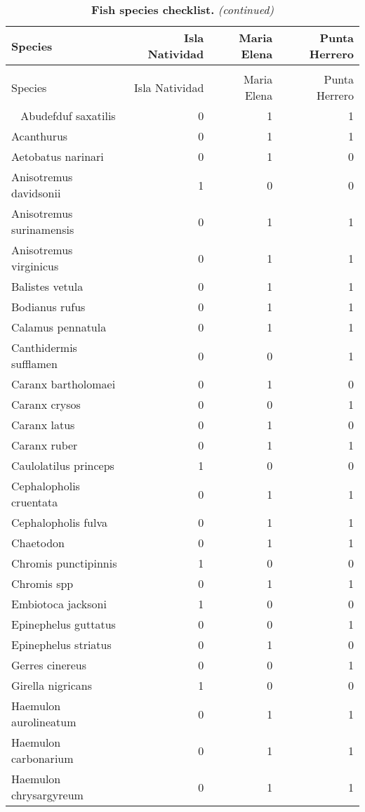 
\begin{longtable}{lrrr}
\caption{\label{tab:}{\bf Fish species checklist.}}\\
\toprule
Species & Isla Natividad & Maria Elena & Punta Herrero\\
\midrule
\endfirsthead
\caption[]{{\bf Fish species checklist.} \textit{(continued)}}\\
\toprule
Species & Isla Natividad & Maria Elena & Punta Herrero\\
\midrule
\endhead
\
\endfoot
\bottomrule
\endlastfoot
Abudefduf saxatilis & 0 & 1 & 1\\
Acanthurus & 0 & 1 & 1\\
Aetobatus narinari & 0 & 1 & 0\\
Anisotremus davidsonii & 1 & 0 & 0\\
Anisotremus surinamensis & 0 & 1 & 1\\
\addlinespace
Anisotremus virginicus & 0 & 1 & 1\\
Balistes vetula & 0 & 1 & 1\\
Bodianus rufus & 0 & 1 & 1\\
Calamus pennatula & 0 & 1 & 1\\
Canthidermis sufflamen & 0 & 0 & 1\\
\addlinespace
Caranx bartholomaei & 0 & 1 & 0\\
Caranx crysos & 0 & 0 & 1\\
Caranx latus & 0 & 1 & 0\\
Caranx ruber & 0 & 1 & 1\\
Caulolatilus princeps & 1 & 0 & 0\\
\addlinespace
Cephalopholis cruentata & 0 & 1 & 1\\
Cephalopholis fulva & 0 & 1 & 1\\
Chaetodon & 0 & 1 & 1\\
Chromis punctipinnis & 1 & 0 & 0\\
Chromis spp & 0 & 1 & 1\\
\addlinespace
Embiotoca jacksoni & 1 & 0 & 0\\
Epinephelus guttatus & 0 & 0 & 1\\
Epinephelus striatus & 0 & 1 & 0\\
Gerres cinereus & 0 & 0 & 1\\
Girella nigricans & 1 & 0 & 0\\
\addlinespace
Haemulon aurolineatum & 0 & 1 & 1\\
Haemulon carbonarium & 0 & 1 & 1\\
Haemulon chrysargyreum & 0 & 1 & 1\\

\end{longtable}
